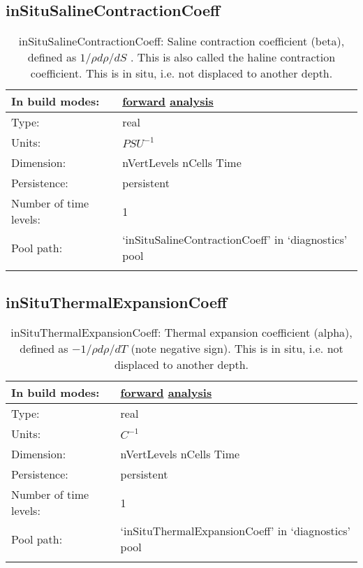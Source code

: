\subsection[inSituSalineContractionCoeff]{inSituSalineContractionCoeff}
\label{subsec:var_sec_diagnostics_inSituSalineContractionCoeff}
\begin{center}
\begin{longtable}{| p{2.0in} | p{4.0in} |}
        \hline 
        In build modes: & \hyperref[subsec:forward_var_tab_diagnostics]{forward} \hyperref[subsec:analysis_var_tab_diagnostics]{analysis} \\
        \hline 
        Type: & real \\
        \hline 
        Units: & $PSU^{-1}$ \\
        \hline 
        Dimension: & nVertLevels nCells Time \\
        \hline 
        Persistence: & persistent \\
        \hline 
        Number of time levels: & 1 \\
        \hline 
            Pool path: & `inSituSalineContractionCoeff' in `diagnostics' pool \\
		 \hline 
    \caption{inSituSalineContractionCoeff:  Saline contraction coefficient (beta), defined as  $1/\rho d\rho/dS$ .  This is also called the haline contraction coefficient.  This is in situ, i.e. not displaced to another depth.}
\end{longtable}
\end{center}
\subsection[inSituThermalExpansionCoeff]{inSituThermalExpansionCoeff}
\label{subsec:var_sec_diagnostics_inSituThermalExpansionCoeff}
\begin{center}
\begin{longtable}{| p{2.0in} | p{4.0in} |}
        \hline 
        In build modes: & \hyperref[subsec:forward_var_tab_diagnostics]{forward} \hyperref[subsec:analysis_var_tab_diagnostics]{analysis} \\
        \hline 
        Type: & real \\
        \hline 
        Units: & $C^{-1}$ \\
        \hline 
        Dimension: & nVertLevels nCells Time \\
        \hline 
        Persistence: & persistent \\
        \hline 
        Number of time levels: & 1 \\
        \hline 
            Pool path: & `inSituThermalExpansionCoeff' in `diagnostics' pool \\
		 \hline 
    \caption{inSituThermalExpansionCoeff:  Thermal expansion coefficient (alpha), defined as  $-1/\rho d\rho/dT$  (note negative sign).  This is in situ, i.e. not displaced to another depth.}
\end{longtable}
\end{center}
